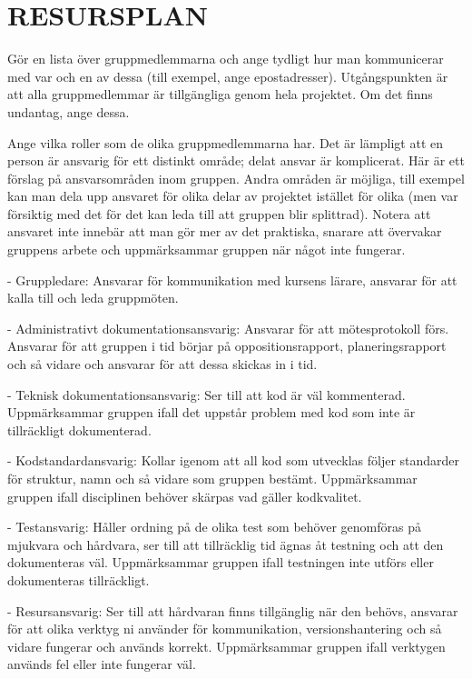 \documentclass[a4paper]{article}
\begin{document}
\section{RESURSPLAN}


Gör en lista över gruppmedlemmarna och ange tydligt hur man kommunicerar
med var och en av dessa (till exempel, ange epostadresser).
Utgångspunkten är att alla gruppmedlemmar är tillgängliga genom hela
projektet. Om det finns undantag, ange dessa.

Ange vilka roller som de olika gruppmedlemmarna har. Det är lämpligt att
en person är ansvarig för ett distinkt område; delat ansvar är
komplicerat. Här är ett förslag på ansvarsområden inom gruppen. Andra
områden är möjliga, till exempel kan man dela upp ansvaret för olika
delar av projektet istället för olika (men var försiktig med det för det
kan leda till att gruppen blir splittrad). Notera att ansvaret inte
innebär att man gör mer av det praktiska, snarare att övervakar gruppens
arbete och uppmärksammar gruppen när något inte fungerar.

-   Gruppledare: Ansvarar för kommunikation med kursens lärare, ansvarar
    för att kalla till och leda gruppmöten.

-   Administrativt dokumentationsansvarig: Ansvarar för att
    mötesprotokoll förs. Ansvarar för att gruppen i tid börjar på
    oppositionsrapport, planeringsrapport och så vidare och ansvarar för
    att dessa skickas in i tid.

-   Teknisk dokumentationsansvarig: Ser till att kod är väl kommenterad.
    Uppmärksammar gruppen ifall det uppstår problem med kod som inte är
    tillräckligt dokumenterad.

-   Kodstandardansvarig: Kollar igenom att all kod som utvecklas följer
    standarder för struktur, namn och så vidare som gruppen bestämt.
    Uppmärksammar gruppen ifall disciplinen behöver skärpas vad
    gäller kodkvalitet.

-   Testansvarig: Håller ordning på de olika test som behöver genomföras
    på mjukvara och hårdvara, ser till att tillräcklig tid ägnas åt
    testning och att den dokumenteras väl. Uppmärksammar gruppen ifall
    testningen inte utförs eller dokumenteras tillräckligt.

-   Resursansvarig: Ser till att hårdvaran finns tillgänglig när den
    behövs, ansvarar för att olika verktyg ni använder för
    kommunikation, versionshantering och så vidare fungerar och
    används korrekt. Uppmärksammar gruppen ifall verktygen används fel
    eller inte fungerar väl.
\end{document}
